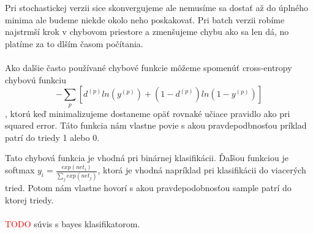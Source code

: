 \documentclass{article}
\numberwithin{equation}{section} %
\begin{document}
Pri stochastickej verzii sice skonvergujeme ale nemusíme sa dostať až do úplného minima ale budeme niekde okolo neho poskakovať. Pri batch verzii robíme najstrmší krok v chybovom priestore a zmenšujeme chybu ako sa len dá, no platíme za to dlším časom počítania. \\\\
Ako dalšie často používané chybové funkcie môžeme spomenúť cross-entropy chybovú funkciu $$-\sum_p [d^{(p)} ln (y^{(p)}) + (1 - d^{(p)})ln(1-y^{(p)})]$$, ktorú keď minimalizujeme dostaneme opäť rovnaké učiace pravidlo ako pri squared error. Táto funkcia nám vlastne povie s akou pravdepodbnosťou príklad patrí do triedy 1 alebo 0.

Tato chybová funkcia je vhodná pri binárnej klasifikácii. Ďaľšou funkciou je softmax $y_i = \frac{exp(net_i)}{\sum_j exp(net_j)}$, ktorá je vhodná napríklad pri klasifikácii do viacerých tried. Potom nám vlastne hovorí s akou pravdepodobnosťou sample patrí do ktorej triedy.
\\\\ \textcolor{red}{TODO} súvis s bayes klasifikatorom.
\end{document}

